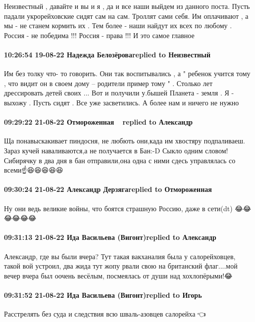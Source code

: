 Неизвестный , давайте и вы и я , да и все наши выйдем из данного поста. Пусть
падали укрорейховские сидят сам на сам. Троллят сами себя. Им оплачивают , а мы
- не станем кормить их . Тем более - наши найдут их всех по любому . Россия -
не победима !!! Россия - права !!! И это самое главное

\paragraph{10:26:54 19-08-22 Надежда Белозёроваreplied to Неизвестный}

Им без толку что- то говорить. Они так воспитывались , а " ребенок учится тому
, что видит он в своем дому -- родители пример тому " . Столько лет
дрессировать детей своих ... Вот и получили у.бышей Планета - земля . Я -
выхожу . Пусть сидят . Все уже засветились. А более нам и ничего не нужно

\paragraph{09:29:22 21-08-22 Отмороженная 🤘🤘🤘replied to Александр}

Ща понавыскакивает пиндосня,
не любють они,када им хвостяру подпаливаеш.
Зараз кучей наваливаются,а не
получается в Бан:-D
Сыкло одним словом!
Сибирячку в два дня в бан отправили,она одна с ними сдесь управлялась со всеми☝️😆😆😆😆😆

\paragraph{09:30:24 21-08-22 Александр Дерзягаreplied to Отмороженная}

Ну они ведь великие войны, что боятся страшную Россию, даже в сети(dt)
😂😂😂😂😂😂


\paragraph{09:31:13 21-08-22 Ида Васильева (Вигонт)replied to Александр}

Александр, где вы были вчера? Тут такая вакханалия была у салорейховцев, такой
вой устроил, два жида тут жопу рвали свою на британский флаг....мой вечер вчера
был оочень весёлым, посмеялась от души над хохлопёрыми!😂

\paragraph{09:31:52 21-08-22 Ида Васильева (Вигонт)replied to Игорь}

Расстрелять без суда и следствия всю шваль-азовцев салорейха🤪👈

